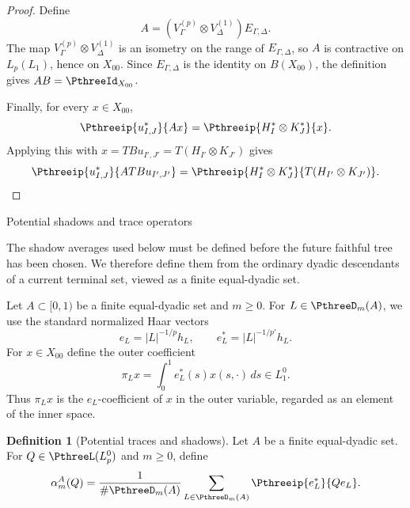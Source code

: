 \documentclass[11pt,reqno]{amsart}
\makeatletter
\theoremstyle{plain}
\theoremstyle{definition}
\newtheorem{definition}[definition]{Definition}
\newcounter{problempaper}
\newenvironment{problempaperbody}{%
  \setcounter{subsection}{0}%
  \setcounter{subsubsection}{0}%
  \setcounter{paragraph}{0}%
  \renewcommand{\thesubsection}{\arabic{subsection}}%
  \renewcommand{\thesubsubsection}{\thesubsection.\arabic{subsubsection}}%
  \renewcommand{\theparagraph}{\thesubsubsection.\arabic{paragraph}}%
  \let\problem@outersection\section
  \let\problem@outersubsection\subsection
  \let\problem@outersubsubsection\subsubsection
  \let\problem@outerparagraph\paragraph
  \let\section\problem@papersection
  \let\subsection\problem@papersubsection
  \let\subsubsection\problem@papersubsubsection
}{%
  \let\section\problem@outersection
  \let\subsection\problem@outersubsection
  \let\subsubsection\problem@outersubsubsection
  \let\paragraph\problem@outerparagraph
}
\newcommand{\problem@target}[2]{%
  \hypertarget{problem-\theproblempaper-#1-#2}{}%
}
\newcommand{\problem@paperheading}[3]{%
  \par\bigskip
  \problem@target{#1}{#2}%
  \noindent{\large\bfseries #2.\quad #3\par}%
  \nobreak\smallskip
}
\newcommand{\problem@papersubheading}[3]{%
  \par\medskip
  \problem@target{#1}{#2}%
  \noindent{\normalsize\bfseries #2.\quad #3\par}%
  \nobreak\smallskip
}
\newcommand{\problem@papersubsubheading}[3]{%
  \par\smallskip
  \problem@target{#1}{#2}%
  \noindent{\normalsize\itshape #2.\quad #3.\ }%
}
\def\problem@papersection{%
  \@ifstar{\problem@papersectionstar}{\problem@papersectionnostar}%
}
\def\problem@papersectionstar#1{%
  \par\bigskip\noindent{\large\bfseries #1\par}\nobreak\smallskip
}
\def\problem@papersectionnostar#1{%
  \refstepcounter{subsection}%
  \setcounter{subsubsection}{0}%
  \setcounter{paragraph}{0}%
  \problem@paperheading{section}{\thesubsection}{#1}%
  \problem@writecontentsline{section}{\thesubsection}{#1}%
}
\def\problem@papersubsection{%
  \@ifstar{\problem@papersubsectionstar}{\problem@papersubsectionnostar}%
}
\def\problem@papersubsectionstar#1{%
  \par\medskip\noindent{\normalsize\bfseries #1\par}\nobreak\smallskip
}
\def\problem@papersubsectionnostar#1{%
  \refstepcounter{subsubsection}%
  \setcounter{paragraph}{0}%
  \problem@papersubheading{subsection}{\thesubsubsection}{#1}%
  \problem@writecontentsline{subsection}{\thesubsubsection}{#1}%
}
\def\problem@papersubsubsection{%
  \@ifstar{\problem@papersubsubsectionstar}{\problem@papersubsubsectionnostar}%
}
\def\problem@papersubsubsectionstar#1{%
  \par\smallskip\noindent{\normalsize\itshape #1.\ }%
}
\def\problem@papersubsubsectionnostar#1{%
  \refstepcounter{paragraph}%
  \problem@papersubsubheading{subsubsection}{\theparagraph}{#1}%
  \problem@writecontentsline{subsubsection}{\theparagraph}{#1}%
}
\newcommand{\problem@writecontentsline}[3]{%
  \begingroup
  \protected@write\@auxout{}{%
    \string\problemcontentsentry{\theproblempaper}{#1}{#2}{#3}{\thepage}%
  }%
  \endgroup
}
\newcommand{\problemcontentsentry}[5]{%
  \@ifundefined{problemcontents@#1}{%
    \expandafter\gdef\csname problemcontents@#1\endcsname{}%
  }{}%
  \expandafter\g@addto@macro\csname problemcontents@#1\endcsname{%
    \problemcontentsline{#1}{#2}{#3}{#4}{#5}%
  }%
}
\newcommand{\problemcontentslink}[4]{%
  \hyperlink{problem-#1-#2-#3}{#4}%
}
\newcommand{\problemcontentsline}[5]{%
  \ifstrequal{#2}{section}{%
    \par\noindent
    \problemcontentslink{#1}{#2}{#3}{\makebox[2.5em][l]{#3}#4}%
    \nobreak\dotfill
    \problemcontentslink{#1}{#2}{#3}{#5}\par
  }{%
    \ifstrequal{#2}{subsection}{%
      \par\noindent\hspace*{1.5em}%
      \problemcontentslink{#1}{#2}{#3}{\makebox[3.5em][l]{#3}#4}%
      \nobreak\dotfill
      \problemcontentslink{#1}{#2}{#3}{#5}\par
    }{%
      \par\noindent\hspace*{3em}%
      \problemcontentslink{#1}{#2}{#3}{\makebox[4.5em][l]{#3}#4}%
      \nobreak\dotfill
      \problemcontentslink{#1}{#2}{#3}{#5}\par
    }%
  }%
}
\makeatother
\begin{document}
\begin{problempaperbody}
\begin{proof}
Define
\begin{equation*}
        A=(V_\Gamma^{(p)}\otimes V_\Delta^{(1)})E_{\Gamma,\Delta}.
\end{equation*}
The map $V_\Gamma^{(p)}\otimes V_\Delta^{(1)}$ is an isometry on the range of $E_{\Gamma,\Delta}$, so $A$ is contractive on $L_p(L_1)$, hence on $X_{00}$. Since $E_{\Gamma,\Delta}$ is the identity on $B(X_{00})$, the definition gives $AB=\PthreeId_{X_{00}}$.

Finally, for every $x\in X_{00}$,
\begin{equation*}
        \Pthreeip{u_{I,J}^*}{Ax}=\Pthreeip{H_I^*\otimes K_J^*}{x}.
\end{equation*}
Applying this with $x=TB u_{I',J'}=T(H_{I'}\otimes K_{J'})$ gives
\begin{equation*}
        \Pthreeip{u_{I,J}^*}{ATB u_{I',J'}}=\Pthreeip{H_I^*\otimes K_J^*}{T(H_{I'}\otimes K_{J'})}. \qedhere
\end{equation*}
\end{proof}

\section{Potential shadows and trace operators}\label{p3:sec:potential-packet-shadows}

The shadow averages used below must be defined before the future faithful tree has been chosen. We therefore define them from the ordinary dyadic descendants of a current terminal set, viewed as a finite equal-dyadic set.

Let $A\subset[0,1)$ be a finite equal-dyadic set and $m \geq 0$.
For $L\in\PthreeD_m(A)$, we use the standard normalized Haar vectors
\begin{equation*}
        e_L=|L|^{-1/p}h_L, \qquad e_L^*=|L|^{-1/p'}h_L.
\end{equation*}
For $x\in X_{00}$ define the outer coefficient
\begin{equation*}
        \pi_Lx=\int_0^1 e_L^*(s)x(s,\cdot)\,ds\in L_1^0.
\end{equation*}
Thus $\pi_Lx$ is the $e_L$-coefficient of $x$ in the outer variable, regarded as an element of the inner space.

\begin{definition}[Potential traces and shadows]
\label{p3:def:potential-packet-traces-shadows}
Let $A$ be a finite equal-dyadic set. For $Q\in\PthreeL(L_p^0)$ and $m\geq0$, define
\begin{equation*}
        \alpha_m^A(Q) = \frac1{\#\PthreeD_m(A)} \sum_{L\in\PthreeD_m(A)} \Pthreeip{e_L^*}{Qe_L}.
\end{equation*}


\end{definition}
\end{problempaperbody}
\end{document}
